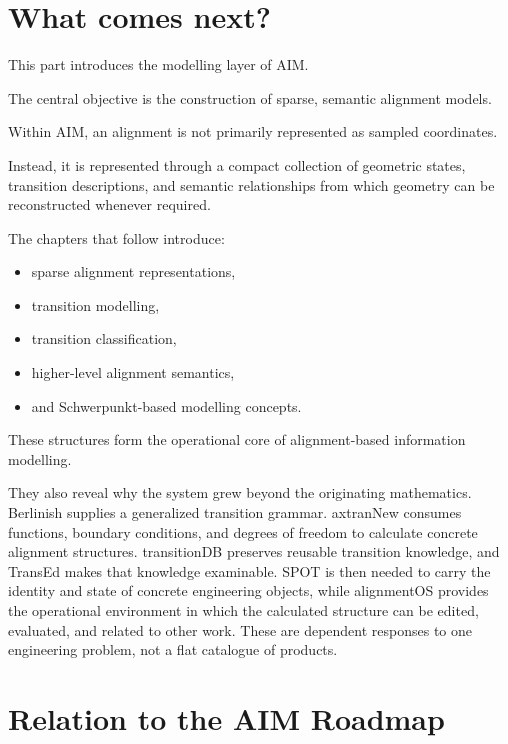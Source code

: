 \section*{What comes next?}

This part introduces the modelling layer of AIM.

The central objective is the construction of sparse, semantic alignment
models.

Within AIM, an alignment is not primarily represented as sampled
coordinates.

Instead, it is represented through a compact collection of geometric
states, transition descriptions, and semantic relationships from which
geometry can be reconstructed whenever required.

The chapters that follow introduce:
\begin{itemize}
\item sparse alignment representations,
\item transition modelling,
\item transition classification,
\item higher-level alignment semantics,
\item and Schwerpunkt-based modelling concepts.
\end{itemize}

These structures form the operational core of alignment-based
information modelling.

They also reveal why the system grew beyond the originating mathematics.
Berlinish supplies a generalized transition grammar. axtranNew consumes
functions, boundary conditions, and degrees of freedom to calculate concrete
alignment structures. transitionDB preserves reusable transition knowledge,
and TransEd makes that knowledge examinable. SPOT is then needed to carry the
identity and state of concrete engineering objects, while alignmentOS provides
the operational environment in which the calculated structure can be edited,
evaluated, and related to other work. These are dependent responses to one
engineering problem, not a flat catalogue of products.

\section*{Relation to the AIM Roadmap}

